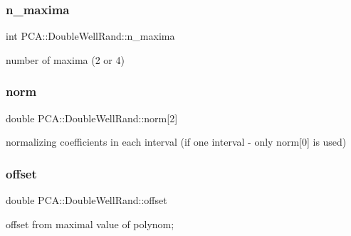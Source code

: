 \subsubsection{\texorpdfstring{n\+\_\+maxima}{n\_maxima}}
{\footnotesize\ttfamily int P\+C\+A\+::\+Double\+Well\+Rand\+::n\+\_\+maxima\hspace{0.3cm}{\ttfamily [private]}}



number of maxima (2 or 4) 

\hypertarget{class_p_c_a_1_1_double_well_rand_aa31900946aeacdd5f462704393b93413}{}\label{class_p_c_a_1_1_double_well_rand_aa31900946aeacdd5f462704393b93413} 
\subsubsection{\texorpdfstring{norm}{norm}}
{\footnotesize\ttfamily double P\+C\+A\+::\+Double\+Well\+Rand\+::norm\mbox{[}2\mbox{]}\hspace{0.3cm}{\ttfamily [private]}}



normalizing coefficients in each interval (if one interval -\/ only norm\mbox{[}0\mbox{]} is used) 

\hypertarget{class_p_c_a_1_1_double_well_rand_abad044e066c9b93b3eacb6d36440f650}{}\label{class_p_c_a_1_1_double_well_rand_abad044e066c9b93b3eacb6d36440f650} 
\subsubsection{\texorpdfstring{offset}{offset}}
{\footnotesize\ttfamily double P\+C\+A\+::\+Double\+Well\+Rand\+::offset\hspace{0.3cm}{\ttfamily [private]}}



offset from maximal value of polynom; 

\hypertarget{class_p_c_a_1_1_double_well_rand_a44577274c594e30092748eb446d8dd40}{}\label{class_p_c_a_1_1_double_well_rand_a44577274c594e30092748eb446d8dd40} 
